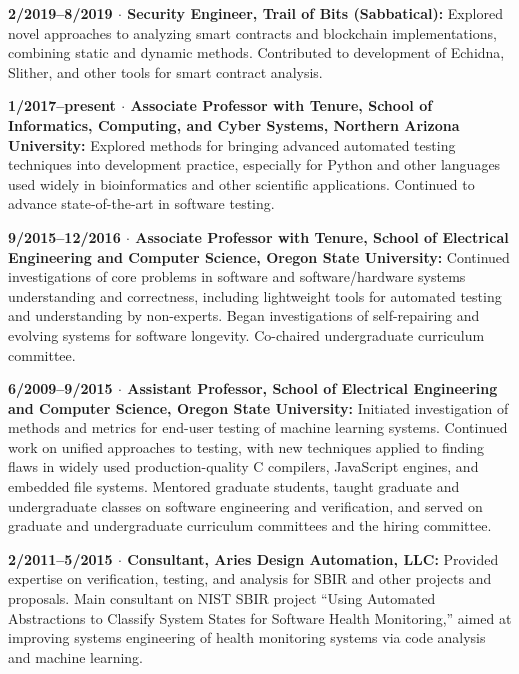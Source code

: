 \documentclass[ComputerScience]{vita}
\begin{document}
\begin{vita}
\begin{Experience}
\item {\bf 2/2019--8/2019 $\cdot$ Security Engineer, Trail of Bits
    (Sabbatical):} Explored novel approaches to analyzing smart
  contracts and blockchain implementations, combining static and dynamic
  methods.  Contributed to development of Echidna, Slither, and other
  tools for smart contract analysis.

\item {\bf 1/2017--present $\cdot$ Associate Professor with Tenure, School of Informatics, Computing, and Cyber Systems, Northern Arizona University:} Explored methods for bringing advanced automated testing techniques into development practice, especially for Python and other languages used widely in bioinformatics and other scientific applications.  Continued to advance state-of-the-art in software testing.

  \item {\bf 9/2015--12/2016 $\cdot$ Associate Professor with Tenure, School of Electrical Engineering and Computer Science, Oregon State University:} Continued investigations of core problems in software and software/hardware systems understanding and correctness, including lightweight tools for automated testing and understanding by non-experts.  Began investigations of self-repairing and evolving systems for software longevity.  Co-chaired undergraduate curriculum committee.

  \item {\bf 6/2009--9/2015 $\cdot$ Assistant Professor, School of
    Electrical Engineering and Computer Science, Oregon State
    University:} Initiated investigation of methods and metrics for
    end-user testing of machine learning systems.  Continued work
    on unified approaches to testing, with new techniques applied to finding flaws in widely used production-quality C compilers, JavaScript engines, and embedded file systems.  Mentored graduate
    students, taught graduate and undergraduate classes on software
    engineering and verification, and served on graduate and undergraduate curriculum committees and the hiring committee.

  \item {\bf 2/2011--5/2015 $\cdot$ Consultant, Aries Design Automation, LLC:} Provided expertise on verification, testing, and analysis for SBIR and other projects and proposals.  Main consultant on NIST SBIR project ``Using Automated Abstractions to Classify System States for Software Health Monitoring,'' aimed at improving systems engineering of health monitoring systems via code analysis and machine learning.


\end{Experience}
\end{vita}
\end{document}
